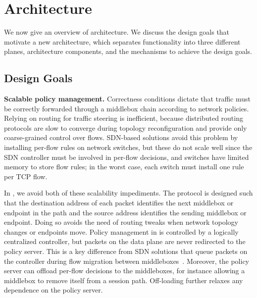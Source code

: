 \section{Architecture}\label{sec:arch}

We now  give  an overview of   \system architecture.  We  discuss  the
design goals that    motivate  a new architecture, which     separates
functionality  into three different  planes,  architecture components,
and the mechanisms to achieve the design goals.
\subsection{Design Goals}

{\bf  Scalable   policy management.}    Correctness conditions dictate that traffic must be correctly forwarded through a middlebox chain according to network policies.  Relying on routing
for traffic steering  is inefficient, because distributed
routing protocols are slow to converge during topology reconfiguration
and   provide only  coarse-grained   control  over  flows.   SDN-based
solutions  avoid this problem  by installing per-flow rules on network
switches, but these do not scale well since the SDN controller must be
involved  in per-flow decisions, and switches  have  limited memory to
store flow rules; in the worst case, each switch must install one rule
per TCP flow.

In \system,    we avoid both of    these scalability  impediments. The
protocol is designed such that the destination  address of each packet
identifies the next middlebox  or endpoint in  the path and the source
address identifies the sending  middlebox or endpoint. Doing so avoids
the need of routing tweaks  when network topology changes or endpoints
move.    Policy  management in \system  is   controlled by a logically
centralized controller,  but  packets  on the   data  plane are  never
redirected  to the policy server.   This is a  key difference from SDN
solutions  that queue packets  on the controller during flow migration
between middleboxes~\cite{OpenNF}.   Moreover, the  policy  server can
offload per-flow  decisions   to the middleboxes, for   instance allowing a
middlebox  to remove  itself  from  a session
path. Off-loading further relaxes any dependence on the policy server.

